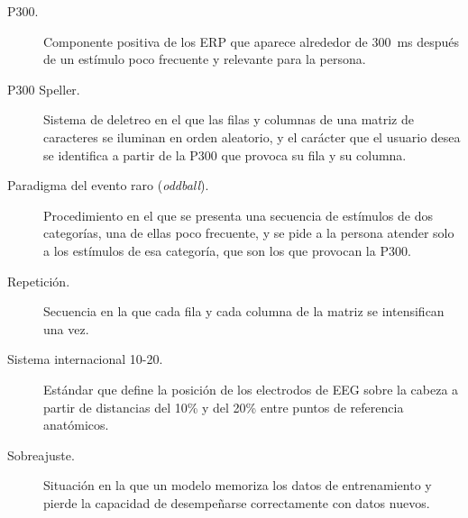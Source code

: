 \begin{description}
  \item[P300.] Componente positiva de los ERP que aparece alrededor de 300~ms después de un estímulo
  poco frecuente y relevante para la persona.

  \item[P300 Speller.] Sistema de deletreo en el que las filas y columnas de una matriz de
  caracteres se iluminan en orden aleatorio, y el carácter que el usuario desea se identifica a
  partir de la P300 que provoca su fila y su columna.

  \item[Paradigma del evento raro (\textit{oddball}).] Procedimiento en el que se presenta una
  secuencia de estímulos de dos categorías, una de ellas poco frecuente, y se pide a la persona
  atender solo a los estímulos de esa categoría, que son los que provocan la P300.

  \item[Repetición.] Secuencia en la que cada fila y cada columna de la matriz se intensifican una
  vez.

  \item[Sistema internacional 10-20.] Estándar que define la posición de los electrodos de EEG sobre
  la cabeza a partir de distancias del 10\% y del 20\% entre puntos de referencia anatómicos.

  \item[Sobreajuste.] Situación en la que un modelo memoriza los datos de entrenamiento y pierde la
  capacidad de desempeñarse correctamente con datos nuevos.
\end{description}
